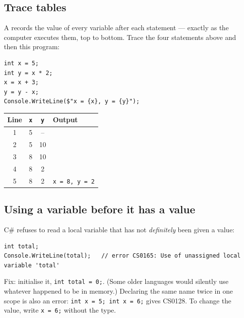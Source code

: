 \subsection{Trace tables}
A  records the value of every variable after each statement --- exactly as the computer executes them, top to bottom. Trace the four statements above and then this program:
\begin{center}
\begin{minipage}[c]{0.46\linewidth}
\begin{lstlisting}
int x = 5;
int y = x * 2;
x = x + 3;
y = y - x;
Console.WriteLine($"x = {x}, y = {y}");
\end{lstlisting}
\end{minipage}\hfill
\begin{minipage}[c]{0.46\linewidth}\centering\small
\begin{tabular}{cccl}
\toprule
Line & \texttt{x} & \texttt{y} & Output\\ \midrule
1 & 5 & -- & \\ 2 & 5 & 10 & \\ 3 & 8 & 10 & \\ 4 & 8 & 2 & \\ 5 & 8 & 2 & \texttt{x = 8, y = 2}\\ \bottomrule
\end{tabular}
\end{minipage}
\end{center}

\subsection{Using a variable before it has a value}
C\# refuses to read a local variable that has not \emph{definitely} been given a value:
\begin{lstlisting}[numbers=none]
int total;
Console.WriteLine(total);   // error CS0165: Use of unassigned local variable 'total'
\end{lstlisting}
Fix: initialise it, \texttt{int total = 0;}. (Some older languages would silently use whatever happened to be in memory.) Declaring the same name twice in one scope is also an error: \texttt{int x = 5; int x = 6;} gives CS0128. To change the value, write \texttt{x = 6;} without the type.

